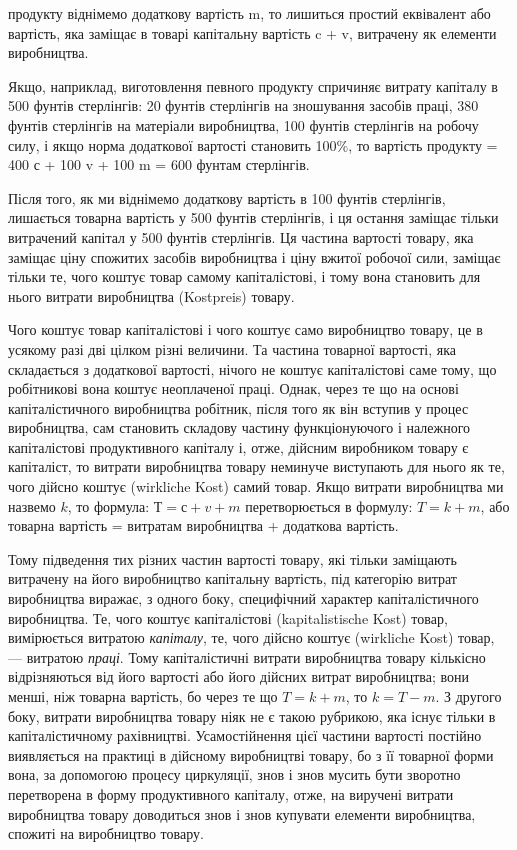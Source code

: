 \parcont{}  %
продукту віднімемо додаткову вартість m, то лишиться простий
еквівалент або вартість, яка заміщає в товарі капітальну вартість
c + v, витрачену як елементи виробництва.

Якщо, наприклад, виготовлення певного продукту спричиняє
витрату капіталу в 500 фунтів стерлінгів: 20 фунтів стерлінгів на
зношування засобів праці, 380 фунтів стерлінгів на матеріали
виробництва, 100 фунтів стерлінгів на робочу силу, і якщо норма
додаткової вартості становить 100\%, то вартість продукту =
400 с + 100 v + 100 m = 600 фунтам стерлінгів.

Після того, як ми віднімемо додаткову вартість в 100 фунтів
стерлінгів, лишається товарна вартість у 500 фунтів стерлінгів,
і ця остання заміщає тільки витрачений капітал у 500 фунтів
стерлінгів. Ця частина вартості товару, яка заміщає ціну спожитих
засобів виробництва і ціну вжитої робочої сили, заміщає
тільки те, чого коштує товар самому капіталістові, і тому вона
становить для нього витрати виробництва (Kostpreis) товару.

Чого коштує товар капіталістові і чого коштує само виробництво
товару, це в усякому разі дві цілком різні величини. Та
частина товарної вартості, яка складається з додаткової вартості,
нічого не коштує капіталістові саме тому, що робітникові
вона коштує неоплаченої праці. Однак, через те що на основі
капіталістичного виробництва робітник, після того як він вступив
у процес виробництва, сам становить складову частину
функціонуючого і належного капіталістові продуктивного капіталу
і, отже, дійсним виробником товару є капіталіст, то витрати
виробництва товару неминуче виступають для нього як
те, чого дійсно коштує (wirkliche Kost) самий товар. Якщо витрати
виробництва ми назвемо $k$, то формула: $Т = с + v + m$
перетворюється в формулу: $T = k + m$, або товарна вартість =
витратам виробництва + додаткова вартість.

Тому підведення тих різних частин вартості товару, які тільки
заміщають витрачену на його виробництво капітальну вартість,
під категорію витрат виробництва виражає, з одного боку, специфічний
характер капіталістичного виробництва. Те, чого коштує
капіталістові (kapitalistische Kost) товар, вимірюється витратою
\emph{капіталу}, те, чого дійсно коштує (wirkliche Kost) товар, —
витратою \emph{праці}. Тому капіталістичні витрати виробництва товару
кількісно відрізняються від його вартості або його дійсних
витрат виробництва; вони менші, ніж товарна вартість, бо через
те що $T = k + m$, то $k = T - m$. З другого боку, витрати
виробництва товару ніяк не є такою рубрикою, яка існує тільки
в капіталістичному рахівництві. Усамостійнення цієї частини вартості
постійно виявляється на практиці в дійсному виробництві
товару, бо з її товарної форми вона, за допомогою процесу
циркуляції, знов і знов мусить бути зворотно перетворена
в форму продуктивного капіталу, отже, на виручені витрати виробництва
товару доводиться знов і знов купувати елементи
виробництва, спожиті на виробництво товару.

